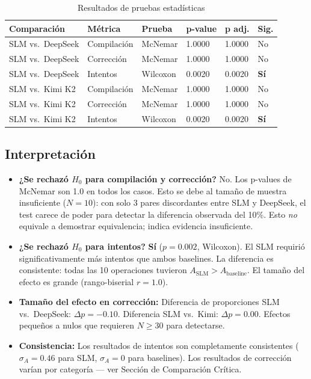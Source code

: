 \documentclass[12pt]{article}
\begin{document}
\begin{table}[H]
\centering
\caption{Resultados de pruebas estadísticas}
\begin{tabular}{llllll}
\toprule
\textbf{Comparación} & \textbf{Métrica} & \textbf{Prueba} &
  \textbf{p-value} & \textbf{p adj.} & \textbf{Sig.} \\
\midrule
SLM vs.\ DeepSeek & Compilación & McNemar & 1.0000 & 1.0000 & No \\
SLM vs.\ DeepSeek & Corrección  & McNemar & 1.0000 & 1.0000 & No \\
SLM vs.\ DeepSeek & Intentos    & Wilcoxon & 0.0020 & 0.0020 & \textbf{Sí} \\
\midrule
SLM vs.\ Kimi K2  & Compilación & McNemar & 1.0000 & 1.0000 & No \\
SLM vs.\ Kimi K2  & Corrección  & McNemar & 1.0000 & 1.0000 & No \\
SLM vs.\ Kimi K2  & Intentos    & Wilcoxon & 0.0020 & 0.0020 & \textbf{Sí} \\
\bottomrule
\end{tabular}
\end{table}

\subsection*{Interpretación}

\begin{itemize}
  \item \textbf{¿Se rechazó $H_0$ para compilación y corrección?} No. Los p-values
    de McNemar son 1.0 en todos los casos. Esto se debe al tamaño de muestra insuficiente
    ($N=10$): con solo 3 pares discordantes entre SLM y DeepSeek, el test carece de poder
    para detectar la diferencia observada del 10\%. Esto \emph{no} equivale a demostrar
    equivalencia; indica evidencia insuficiente.

  \item \textbf{¿Se rechazó $H_0$ para intentos?} \textbf{Sí} ($p = 0.002$, Wilcoxon).
    El SLM requirió significativamente más intentos que ambos baselines. La diferencia
    es consistente: todas las 10 operaciones tuvieron $A_{\text{SLM}} > A_{\text{baseline}}$.
    El tamaño del efecto es grande (rango-biserial $r = 1.0$).

  \item \textbf{Tamaño del efecto en corrección:}
    Diferencia de proporciones SLM vs.\ DeepSeek: $\Delta p = -0.10$.
    Diferencia SLM vs.\ Kimi: $\Delta p = 0.00$.
    Efectos pequeños a nulos que requieren $N \geq 30$ para detectarse.

  \item \textbf{Consistencia:} Los resultados de intentos son completamente consistentes
    ($\sigma_A = 0.46$ para SLM, $\sigma_A = 0$ para baselines). Los resultados de
    corrección varían por categoría — ver Sección de Comparación Crítica.
\end{itemize}
\end{document}
